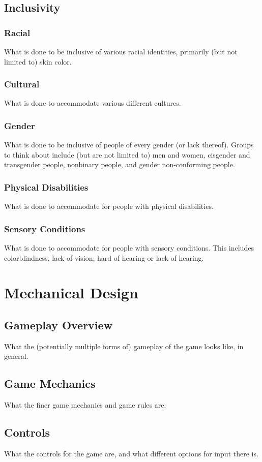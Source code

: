 \subsection{Inclusivity}
\subsubsection{Racial}
What is done to be inclusive of various racial identities, primarily (but not limited to) skin color.
\subsubsection{Cultural}
What is done to accommodate various different cultures.
\subsubsection{Gender}
What is done to be inclusive of people of every gender (or lack thereof). Groups to think about include (but are not limited to) men and women, cisgender and transgender people, nonbinary people, and gender non-conforming people.
\subsubsection{Physical Disabilities}
What is done to accommodate for people with physical disabilities.
\subsubsection{Sensory Conditions}
What is done to accommodate for people with sensory conditions. This includes colorblindness, lack of vision, hard of hearing or lack of hearing.

\section{Mechanical Design}
\subsection{Gameplay Overview}
What the (potentially multiple forms of) gameplay of the game looks like, in general.
\subsection{Game Mechanics}
What the finer game mechanics and game rules are.
\subsection{Controls}
What the controls for the game are, and what different options for input there is.

